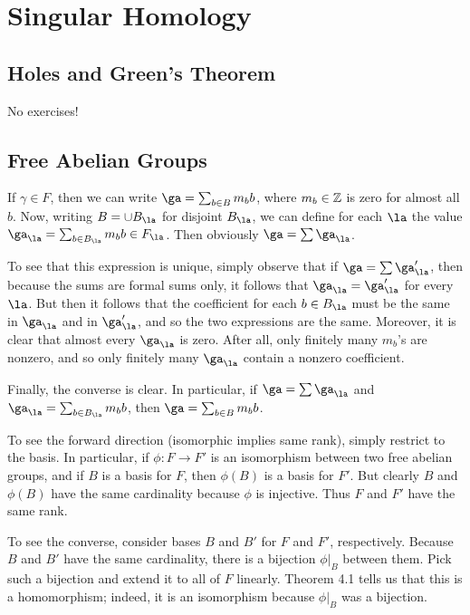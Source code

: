 \documentclass[../../solutions.tex]{subfiles}
\begin{document}
 
\section{Singular Homology}
\subsection{Holes and Green's Theorem}
No exercises! 

\subsection{Free Abelian Groups}
\begin{exercise} \leavevmode
If $\gamma\in F$, then we can write $\ga=\sum_{b\in B}m_bb$, where $m_b\in\mathbb{Z}$ is zero for almost all $b$. 
Now, writing $B=\cup B_\la$ for disjoint $B_\la$, we can define for each $\la$ the value $\ga_\la=\sum_{b\in B_\la}m_bb\in F_\la$. 
Then obviously $\ga=\sum\ga_\la$. 

To see that this expression is unique, simply observe that if $\ga=\sum\ga'_\la$, then because the sums are formal sums only, it follows that $\ga_\la=\ga'_\la$ for every $\la$. 
But then it follows that the coefficient for each $b\in B_\la$ must be the same in $\ga_\la$ and in $\ga'_\la$, and so the two expressions are the same. 
Moreover, it is clear that almost every $\ga_\la$ is zero. 
After all, only finitely many $m_b$'s are nonzero, and so only finitely many $\ga_\la$ contain a nonzero coefficient. 

Finally, the converse is clear. 
In particular, if $\ga=\sum\ga_\la$ and $\ga_\la=\sum_{b\in B_\la}m_bb$, then $\ga=\sum_{b\in B}m_bb$. 
\end{exercise}

\begin{exercise} \leavevmode
To see the forward direction (isomorphic implies same rank), simply restrict to the basis. 
In particular, if $\phi:F\to F'$ is an isomorphism between two free abelian groups, and if $B$ is a basis for $F$, then $\phi(B)$ is a basis for $F'$. 
But clearly $B$ and $\phi(B)$ have the same cardinality because $\phi$ is injective. 
Thus $F$ and $F'$ have the same rank. 

To see the converse, consider bases $B$ and $B'$ for $F$ and $F'$, respectively. 
Because $B$ and $B'$ have the same cardinality, there is a bijection $\phi|_B$ between them. 
Pick such a bijection and extend it to all of $F$ linearly. 
Theorem 4.1 tells us that this is a homomorphism; indeed, it is an isomorphism because $\phi|_B$ was a bijection. 
\end{exercise}
\end{document}
